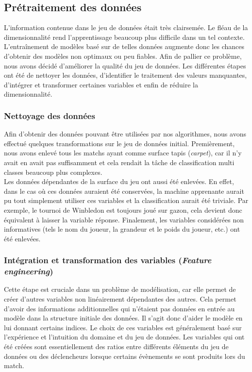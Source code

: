 \subsection{Prétraitement des données}
L'information contenue dans le jeu de données était très clairsemée. Le fléau de la dimensionnalité rend l'apprentissage beaucoup plus difficile dans un tel contexte. L'entraînement de modèles basé sur de telles données augmente donc les chances d'obtenir des modèles non optimaux ou peu fiables. Afin de pallier ce problème, nous avons décidé d'améliorer la qualité du jeu de données. Les différentes étapes ont été de nettoyer les données, d'identifier le traitement des valeurs manquantes, d'intégrer et transformer certaines variables et enfin de réduire la dimensionnalité.

\subsubsection{Nettoyage des données}
Afin d'obtenir des données pouvant être utilisées par nos algorithmes, nous avons effectué quelques transformations sur le jeu de données initial. Premièrement, nous avons enlevé tous les matchs ayant comme surface tapis (\textit{carpet}), car il n'y avait en avait pas suffisamment et cela rendait la tâche de classification multi classes beaucoup plus complexes. \\

 Les données dépendantes de la surface du jeu ont aussi été enlevées. En effet, dans le cas où ces données auraient été conservées, la machine apprenante aurait pu tout simplement utiliser ces variables et la classification aurait été triviale. Par exemple, le tournoi de Winbledon est toujours joué sur gazon, cela devient donc équivalent à laisser la variable réponse. Finalement, les variables considérées non informatives (tels le nom du joueur, la grandeur et le poids du joueur, etc.) ont été enlevées.

\subsubsection{Intégration et transformation des variables (\textit{Feature engineering})}
Cette étape est cruciale dans un problème de modélisation, car elle permet de créer d'autres variables non linéairement dépendantes des autres. Cela permet d'avoir des informations additionnelles qui n'étaient pas données en entrée au modèle dans la structure initiale des données. Il s'agit donc d'aider le modèle en lui donnant certains indices. Le choix de ces variables est généralement basé sur l'expérience et l'intuition du domaine et du jeu de données. Les variables qui ont été créées sont essentiellement des ratios entre différents éléments du jeu de données ou des déclencheurs lorsque certains évènements se sont produits lors du match.\\

